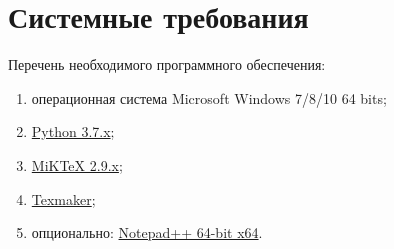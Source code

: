 \section{Системные требования}

Перечень необходимого программного обеспечения:
%
\begin{enumerate}
	\item операционная система Microsoft Windows 7/8/10 64 bits;
	\sloppy %
	\item \href{https://www.python.org/downloads/}{Python 3.7.x};
	\item \href{https://miktex.org/download}{MiKTeX 2.9.x};
	\item \href{http://www.xm1math.net/texmaker/download.html}{Texmaker};
	\item опционально: \href{https://notepad-plus-plus.org/download/}{Notepad++ 64-bit x64}.
\end{enumerate}
